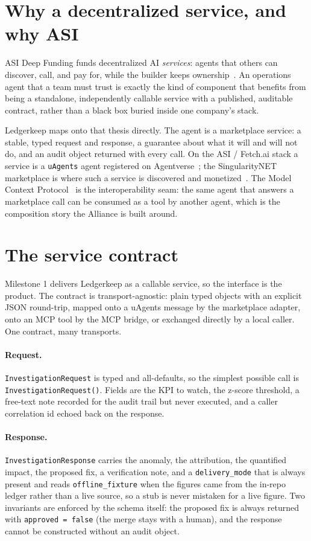 \documentclass[11pt]{article}
\begin{document}
\section{Why a decentralized service, and why ASI}

ASI Deep Funding funds decentralized AI \emph{services}: agents that others can
discover, call, and pay for, while the builder keeps ownership~\cite{asi_deepfunding_2026}.
An operations agent that a team must trust is exactly the kind of component that
benefits from being a standalone, independently callable service with a
published, auditable contract, rather than a black box buried inside one
company's stack.

Ledgerkeep maps onto that thesis directly. The agent is a marketplace service: a
stable, typed request and response, a guarantee about what it will and will not
do, and an audit object returned with every call. On the ASI / Fetch.ai stack a
service is a \texttt{uAgents} agent registered on
Agentverse~\cite{fetchai_uagents_2026}; the SingularityNET marketplace is where
such a service is discovered and monetized~\cite{singularitynet_marketplace_2026}.
The Model Context Protocol~\cite{mcp_spec_2025} is the interoperability seam: the
same agent that answers a marketplace call can be consumed as a tool by another
agent, which is the composition story the Alliance is built around.

\section{The service contract}

Milestone 1 delivers Ledgerkeep as a callable service, so the interface is the
product. The contract is transport-agnostic: plain typed objects with an explicit
JSON round-trip, mapped onto a uAgents message by the marketplace adapter, onto
an MCP tool by the MCP bridge, or exchanged directly by a local caller. One
contract, many transports.

\paragraph{Request.} \texttt{InvestigationRequest} is typed and all-defaults, so
the simplest possible call is \texttt{InvestigationRequest()}. Fields are the KPI
to watch, the z-score threshold, a free-text note recorded for the audit trail
but never executed, and a caller correlation id echoed back on the response.

\paragraph{Response.} \texttt{InvestigationResponse} carries the anomaly, the
attribution, the quantified impact, the proposed fix, a verification note, and a
\texttt{delivery\_mode} that is always present and reads \texttt{offline\_fixture}
when the figures came from the in-repo ledger rather than a live source, so a stub
is never mistaken for a live figure. Two invariants are enforced by the schema
itself: the proposed fix is always returned with \texttt{approved = false} (the
merge stays with a human), and the response cannot be constructed without an
audit object.
\end{document}
